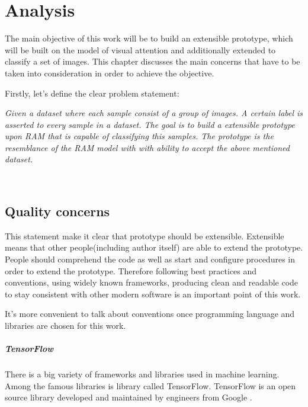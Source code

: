 \chapter{Analysis}
\label{ch:analysis}
The main objective of this work will be to build an extensible prototype,
which will be built on the model of visual attention and additionally
extended to classify
a set of images. This chapter discusses the main concerns
that have to be taken into consideration in order to achieve the objective.

Firstly, let's define the clear problem statement:

\textit{
	Given a dataset where each sample consist of a group of images.
	A certain label is asserted to every sample in a dataset. The goal is
	to build a extensible prototype upon RAM that is capable of classifying
	this samples. The prototype is the resemblance of the RAM model with
	with ability to accept the above mentioned dataset.
}

\\


\section{Quality concerns}
\label{sec:quality_concerns}
This statement make it clear that prototype should be extensible. Extensible
means that other people(including author itself) are able to extend the
prototype. People should comprehend the code as well as start and configure
procedures in order to extend the prototype. Therefore following best practices
and conventions, using widely known frameworks, producing clean and readable code
to stay consistent with other modern software is an important
point of this work.

It's more convenient to talk about conventions once programming language and
libraries are chosen for this work.
\paragraph{TensorFlow}

There is a big variety of frameworks and libraries used in machine learning.
Among the famous libraries is library called TensorFlow. TensorFlow is an open
source library developed and maintained by engineers from Google \cite{tensorflow2015-whitepaper}.


